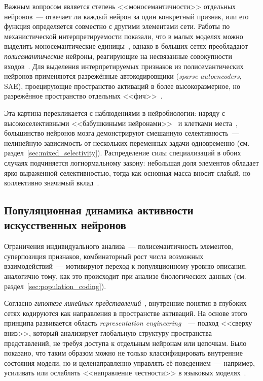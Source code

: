 Важным вопросом является степень <<моносемантичности>> отдельных нейронов~--- отвечает ли каждый нейрон за один конкретный признак, или его функция определяется совместно с другими элементами сети. Работы по механистической интерпретируемости показали, что в малых моделях можно выделить моносемантические единицы~\cite{Anthropic2023monosemanticity}, однако в больших сетях преобладают \textit{полисемантические} нейроны, реагирующие на несвязанные совокупности входов~\cite{Templeton2024scaling}. Для выделения интерпретируемых признаков из полисемантических нейронов применяются разрежённые автокодировщики (\textit{sparse autoencoders}, SAE), проецирующие пространство активаций в более высокоразмерное, но разрежённое пространство отдельных <<фич>>~\cite{Templeton2024scaling}.

Эта картина перекликается с наблюдениями в нейробиологии: наряду с высокоселективными <<бабушкиными нейронами>>~\cite{concepts} и клетками места~\cite{o1971hippocampus}, большинство нейронов мозга демонстрируют смешанную селективность~--- нелинейную зависимость от нескольких переменных задачи одновременно (см. раздел~\ref{sec:mixed_selectivity}). Распределение силы специализаций в обоих случаях подчиняется логнормальному закону: небольшая доля элементов обладает ярко выраженной селективностью, тогда как основная масса вносит слабый, но коллективно значимый вклад~\cite{Buzsaki2014}.

\subsection{Популяционная динамика активности искусственных нейронов}\label{sec:ann_population}

Ограничения индивидуального анализа~--- полисемантичность элементов, суперпозиция признаков, комбинаторный рост числа возможных взаимодействий~--- мотивируют переход к популяционному уровню описания, аналогично тому, как это происходит при анализе биологических данных (см. раздел~\ref{sec:population_coding}).

Согласно \textit{гипотезе линейных представлений}~\cite{Park2023LRH}, внутренние понятия в глубоких сетях кодируются как направления в пространстве активаций. На основе этого принципа развивается область \textit{representation engineering}~\cite{Zou2023RepE}~--- подход <<сверху вниз>>, который анализирует глобальную структуру пространства представлений, не требуя доступа к отдельным нейронам или цепочкам. Было показано, что таким образом можно не только классифицировать внутренние состояния модели, но и целенаправленно управлять её поведением~--- например, усиливать или ослаблять <<направление честности>> в языковых моделях~\cite{Zou2023RepE}.

